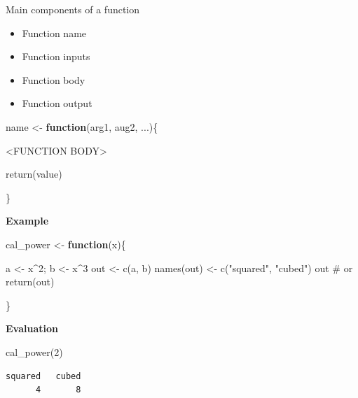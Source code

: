 \documentclass[
  letterpaper,
  DIV=11,
  numbers=noendperiod]{scrreprt}
\newenvironment{Shaded}{\begin{snugshade}}{\end{snugshade}}
\newcommand{\CommentTok}[1]{\textcolor[rgb]{0.37,0.37,0.37}{#1}}
\newcommand{\ControlFlowTok}[1]{\textcolor[rgb]{0.00,0.23,0.31}{\textbf{#1}}}
\newcommand{\DecValTok}[1]{\textcolor[rgb]{0.68,0.00,0.00}{#1}}
\newcommand{\FunctionTok}[1]{\textcolor[rgb]{0.28,0.35,0.67}{#1}}
\newcommand{\NormalTok}[1]{\textcolor[rgb]{0.00,0.23,0.31}{#1}}
\newcommand{\OtherTok}[1]{\textcolor[rgb]{0.00,0.23,0.31}{#1}}
\newcommand{\SpecialCharTok}[1]{\textcolor[rgb]{0.37,0.37,0.37}{#1}}
\newcommand{\StringTok}[1]{\textcolor[rgb]{0.13,0.47,0.30}{#1}}
\begin{document}
Main components of a function

\begin{itemize}
\item
  Function name
\item
  Function inputs
\item
  Function body
\item
  Function output
\end{itemize}

\begin{Shaded}
\begin{Highlighting}[]

\NormalTok{name }\OtherTok{\textless{}{-}} \ControlFlowTok{function}\NormalTok{(arg1, aug2, ...)\{}

\SpecialCharTok{\textless{}}\NormalTok{FUNCTION BODY}\SpecialCharTok{\textgreater{}}

\FunctionTok{return}\NormalTok{(value)}

\NormalTok{\}}
\end{Highlighting}
\end{Shaded}

\textbf{Example}

\begin{Shaded}
\begin{Highlighting}[]
\NormalTok{cal\_power }\OtherTok{\textless{}{-}} \ControlFlowTok{function}\NormalTok{(x)\{}

\NormalTok{a }\OtherTok{\textless{}{-}}\NormalTok{ x}\SpecialCharTok{\^{}}\DecValTok{2}\NormalTok{; b }\OtherTok{\textless{}{-}}\NormalTok{ x}\SpecialCharTok{\^{}}\DecValTok{3}
\NormalTok{out }\OtherTok{\textless{}{-}} \FunctionTok{c}\NormalTok{(a, b)}
\FunctionTok{names}\NormalTok{(out) }\OtherTok{\textless{}{-}} \FunctionTok{c}\NormalTok{(}\StringTok{"squared"}\NormalTok{, }\StringTok{"cubed"}\NormalTok{)}
\NormalTok{out }\CommentTok{\# or return(out)}

\NormalTok{\}}
\end{Highlighting}
\end{Shaded}

\textbf{Evaluation}

\begin{Shaded}
\begin{Highlighting}[]
\FunctionTok{cal\_power}\NormalTok{(}\DecValTok{2}\NormalTok{)}
\end{Highlighting}
\end{Shaded}

\begin{verbatim}
squared   cubed 
      4       8 
\end{verbatim}
\end{document}
